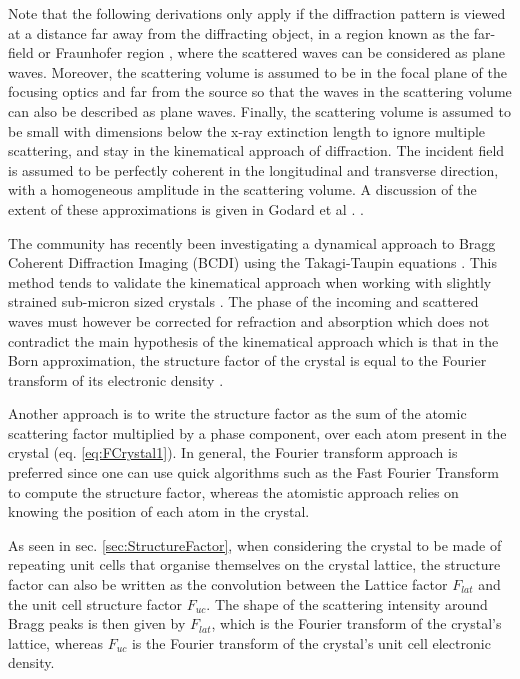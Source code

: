 Note that the following derivations only apply if the diffraction pattern is viewed at a distance far away from the diffracting object, in a region known as the far-field or Fraunhofer region \parencite{Willmott}, where the scattered waves can be considered as plane waves.
Moreover, the scattering volume is assumed to be in the focal plane of the focusing optics and far from the source so that the waves in the scattering volume can also be described as plane waves.
Finally, the scattering volume is assumed to be small with dimensions below the x-ray extinction length to ignore multiple scattering, and stay in the kinematical approach of diffraction.
The incident field is assumed to be perfectly coherent in the longitudinal and transverse direction, with a homogeneous amplitude in the scattering volume.
A discussion of the extent of these approximations is given in Godard et al . \parencite*{Godard2021}.

The community has recently been investigating a dynamical approach to Bragg Coherent Diffraction Imaging (BCDI) \parencite{Yan2014, Shabalin2017, Hu2018, Gao2022} using the Takagi-Taupin equations \parencite{Takagi1962, Takagi1969}.
This method tends to validate the kinematical approach when working with slightly strained sub-micron sized crystals \parencite{Karpov2019, Barringer2021}.
The phase of the incoming and scattered waves must however be corrected for refraction and absorption \parencite{Harder2007, Gao2022} which does not contradict the main hypothesis of the kinematical approach which is that in the Born approximation, the structure factor of the crystal is equal to the Fourier transform of its electronic density \parencite{Paganin}.

Another approach is to write the structure factor as the sum of the atomic scattering factor multiplied by a phase component, over each atom present in the crystal (eq. \ref{eq:FCrystal1}).
In general, the Fourier transform approach is preferred since one can use quick algorithms such as the Fast Fourier Transform \parencite{Cooley1965, Cochran1967} to compute the structure factor, whereas the atomistic approach relies on knowing the position of each atom in the crystal.

As seen in sec. \ref{sec:StructureFactor}, when considering the crystal to be made of repeating unit cells that organise themselves on the crystal lattice, the structure factor can also be written as the convolution between the Lattice factor $F_{lat}$ and the unit cell structure factor $F_{uc}$.
The shape of the scattering intensity around Bragg peaks is then given by $F_{lat}$, which is the Fourier transform of the crystal's lattice, whereas $F_{uc}$ is the Fourier transform of the crystal's unit cell electronic density.

